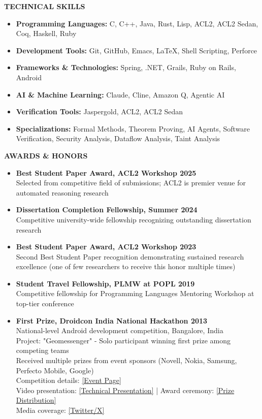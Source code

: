 \documentclass[11pt,letterpaper]{article}
\newcommand{\cvsection}[1]{
    \vspace{0.6em}
    {\color{darkblue}\textbf{\Large #1}}
    \vspace{0.15em}
    \textcolor{lightblue}{\hrulefill}
    \vspace{0.4em}
}
\begin{document}
\cvsection{TECHNICAL SKILLS}
\begin{itemize}
    \item \textbf{Programming Languages:} C, C++, Java, Rust, Lisp, ACL2, ACL2 Sedan, Coq, Haskell, Ruby
    \item \textbf{Development Tools:} Git, GitHub, Emacs, LaTeX, Shell Scripting, Perforce
    \item \textbf{Frameworks \& Technologies:} Spring, .NET, Grails, Ruby on Rails, Android
    \item \textbf{AI \& Machine Learning:} Claude, Cline, Amazon Q, Agentic AI
    \item \textbf{Verification Tools:} Jaspergold, ACL2, ACL2 Sedan
    \item \textbf{Specializations:} Formal Methods, Theorem Proving, AI Agents, Software Verification, Security Analysis, Dataflow Analysis, Taint Analysis
\end{itemize}

\cvsection{AWARDS \& HONORS}
\begin{itemize}
    \item \textbf{Best Student Paper Award, ACL2 Workshop 2025} \\
          Selected from competitive field of submissions; ACL2 is premier venue for automated reasoning research
    \item \textbf{Dissertation Completion Fellowship, Summer 2024} \\
          Competitive university-wide fellowship recognizing outstanding dissertation research
    \item \textbf{Best Student Paper Award, ACL2 Workshop 2023} \\
          Second Best Student Paper recognition demonstrating sustained research excellence (one of few researchers to receive this honor multiple times)
    \item \textbf{Student Travel Fellowship, PLMW at POPL 2019} \\
          Competitive fellowship for Programming Languages Mentoring Workshop at top-tier conference
    \item \textbf{First Prize, Droidcon India National Hackathon 2013} \\
          National-level Android development competition, Bangalore, India \\
          Project: "Geomessenger" - Solo participant winning first prize among competing teams \\
          Received multiple prizes from event sponsors (Novell, Nokia, Samsung, Perfecto Mobile, Google) \\
          Competition details: \href{https://hacknight.in/droidconin/2013-bangalore.html}{[Event Page]} \\
          Video presentation: \href{https://youtu.be/3qtuORgVMrQ}{[Technical Presentation]} | 
          Award ceremony: \href{https://www.youtube.com/watch?v=AFact1zmnEM}{[Prize Distribution]} \\
          Media coverage: \href{https://x.com/s0h4m/status/406767344694747136}{[Twitter/X]}
\end{itemize}
\end{document}
